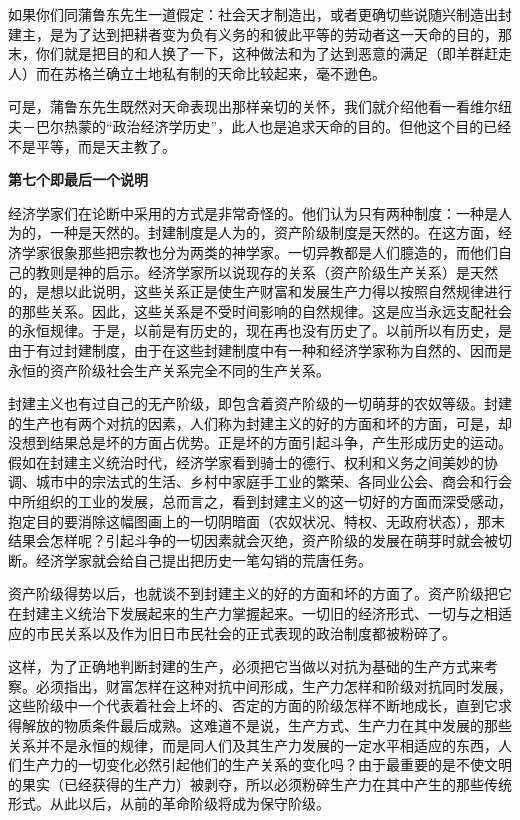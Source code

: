\documentclass[a4paper,twoside,12pt,AutoFakeBold]{ctexart}
\begin{document}
如果你们同蒲鲁东先生一道假定：社会天才制造出，或者更确切些说随兴制造出封建主，是为了达到把耕者变为负有义务的和彼此平等的劳动者这一天命的目的，那末，你们就是把目的和人换了一下，这种做法和为了达到恶意的满足（即羊群赶走人）而在苏格兰确立土地私有制的天命比较起来，毫不逊色。

可是，蒲鲁东先生既然对天命表现出那样亲切的关怀，我们就介绍他看一看维尔纽夫－巴尔热蒙的“政治经济学历史”，此人也是追求天命的目的。但他这个目的已经不是平等，而是天主教了。

\begin{center}
    \textbf{第七个即最后一个说明}
\end{center}

经济学家们在论断中采用的方式是非常奇怪的。他们认为只有两种制度：一种是人为的，一种是天然的。封建制度是人为的，资产阶级制度是天然的。在这方面，经济学家很象那些把宗教也分为两类的神学家。一切异教都是人们臆造的，而他们自己的教则是神的启示。经济学家所以说现存的关系（资产阶级生产关系）是天然的，是想以此说明，这些关系正是使生产财富和发展生产力得以按照自然规律进行的那些关系。因此，这些关系是不受时间影响的自然规律。这是应当永远支配社会的永恒规律。于是，以前是有历史的，现在再也没有历史了。以前所以有历史，是由于有过封建制度，由于在这些封建制度中有一种和经济学家称为自然的、因而是永恒的资产阶级社会生产关系完全不同的生产关系。

封建主义也有过自己的无产阶级，即包含着资产阶级的一切萌芽的农奴等级。封建的生产也有两个对抗的因素，人们称为封建主义的好的方面和坏的方面，可是，却没想到结果总是坏的方面占优势。正是坏的方面引起斗争，产生形成历史的运动。假如在封建主义统治时代，经济学家看到骑士的德行、权利和义务之间美妙的协调、城市中的宗法式的生活、乡村中家庭手工业的繁荣、各同业公会、商会和行会中所组织的工业的发展，总而言之，看到封建主义的这一切好的方面而深受感动，抱定目的要消除这幅图画上的一切阴暗面（农奴状况、特权、无政府状态），那末结果会怎样呢？引起斗争的一切因素就会灭绝，资产阶级的发展在萌芽时就会被切断。经济学家就会给自己提出把历史一笔勾销的荒唐任务。

资产阶级得势以后，也就谈不到封建主义的好的方面和坏的方面了。资产阶级把它在封建主义统治下发展起来的生产力掌握起来。一切旧的经济形式、一切与之相适应的市民关系以及作为旧日市民社会的正式表现的政治制度都被粉碎了。

这样，为了正确地判断封建的生产，必须把它当做以对抗为基础的生产方式来考察。必须指出，财富怎样在这种对抗中间形成，生产力怎样和阶级对抗同时发展，这些阶级中一个代表着社会上坏的、否定的方面的阶级怎样不断地成长，直到它求得解放的物质条件最后成熟。这难道不是说，生产方式、生产力在其中发展的那些关系并不是永恒的规律，而是同人们及其生产力发展的一定水平相适应的东西，人们生产力的一切变化必然引起他们的生产关系的变化吗？由于最重要的是不使文明的果实（已经获得的生产力）被剥夺，所以必须粉碎生产力在其中产生的那些传统形式。从此以后，从前的革命阶级将成为保守阶级。
\end{document}
